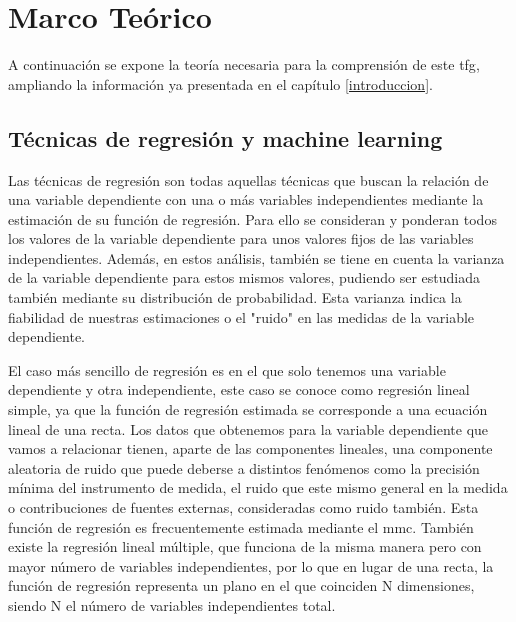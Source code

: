 
\chapter{Marco Teórico}
\label{marcoteorico}
\par A continuación se expone la teoría necesaria para la comprensión de este \gls{tfg}, ampliando la información ya presentada en el capítulo \ref{introduccion}.
\section{Técnicas de regresión y machine learning}
\par Las técnicas de regresión son todas aquellas técnicas que buscan la relación de una variable dependiente con una o más variables independientes mediante la estimación de su función de regresión. Para ello se consideran y ponderan todos los valores de la variable dependiente para unos valores fijos de las variables independientes. Además, en estos análisis, también se tiene en cuenta la varianza de la variable dependiente para estos mismos valores, pudiendo ser estudiada también mediante su distribución de probabilidad. Esta varianza indica la fiabilidad de nuestras estimaciones o el "ruido" en las medidas de la variable dependiente. 
\\
\par El caso más sencillo de regresión es en el que solo tenemos una variable dependiente y otra independiente, este caso se conoce como regresión lineal simple, ya que la función de regresión estimada se corresponde a una ecuación lineal de una recta. Los datos que obtenemos para la variable dependiente que vamos a relacionar tienen, aparte de las componentes lineales, una componente aleatoria de ruido que puede deberse a distintos fenómenos como la precisión mínima del instrumento de medida, el ruido que este mismo general en la medida o contribuciones de fuentes externas, consideradas como ruido también. Esta función de regresión es frecuentemente estimada mediante el \gls{mmc}. También existe la regresión lineal múltiple, que funciona de la misma manera pero con mayor número de variables independientes, por lo que en lugar de una recta, la función de regresión representa un plano en el que coinciden N dimensiones, siendo N el número de variables independientes total. 
